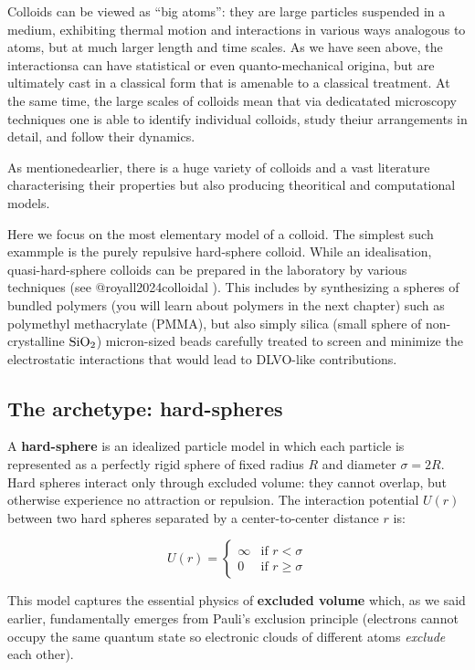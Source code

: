 \documentclass[
  letterpaper,
  enabledeprecatedfontcommands]{report}
\begin{document}
Colloids can be viewed as ``big atoms'': they are large particles
suspended in a medium, exhibiting thermal motion and interactions in
various ways analogous to atoms, but at much larger length and time
scales. As we have seen above, the interactionsa can have statistical or
even quanto-mechanical origina, but are ultimately cast in a classical
form that is amenable to a classical treatment. At the same time, the
large scales of colloids mean that via dedicatated microscopy techniques
one is able to identify individual colloids, study theiur arrangements
in detail, and follow their dynamics.

As mentionedearlier, there is a huge variety of colloids and a vast
literature characterising their properties but also producing
theoritical and computational models.

Here we focus on the most elementary model of a colloid. The simplest
such exammple is the purely repulsive hard-sphere colloid. While an
idealisation, quasi-hard-sphere colloids can be prepared in the
laboratory by various techniques (see @royall2024colloidal ). This
includes by synthesizing a spheres of bundled polymers (you will learn
about polymers in the next chapter) such as polymethyl methacrylate
(PMMA), but also simply silica (small sphere of non-crystalline
\(\rm Si O_2\)) micron-sized beads carefully treated to screen and
minimize the electrostatic interactions that would lead to DLVO-like
contributions.

\subsection{The archetype: hard-spheres}\label{sec-hard-spheres}

A \textbf{hard-sphere} is an idealized particle model in which each
particle is represented as a perfectly rigid sphere of fixed radius
\(R\) and diameter \(\sigma=2R\). Hard spheres interact only through
excluded volume: they cannot overlap, but otherwise experience no
attraction or repulsion. The interaction potential \(U(r)\) between two
hard spheres separated by a center-to-center distance \(r\) is:

\[
U(r) = \begin{cases}
\infty & \text{if } r < \sigma \\
0 & \text{if } r \geq \sigma
\end{cases}
\]

This model captures the essential physics of \textbf{excluded volume}
which, as we said earlier, fundamentally emerges from Pauli's exclusion
principle (electrons cannot occupy the same quantum state so electronic
clouds of different atoms \emph{exclude} each other).
\end{document}
